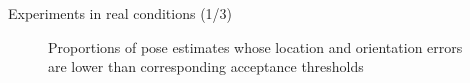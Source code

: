 \begin{frame}[noframenumbering]{Experiments in real conditions (1/3)}

  \vspace{-4cm}
  \begin{figure}
    
    \vspace{0.7cm}
    \caption{\footnotesize Proportions of pose estimates whose location and orientation errors are lower than
             corresponding acceptance thresholds}
  \end{figure}

\end{frame}
